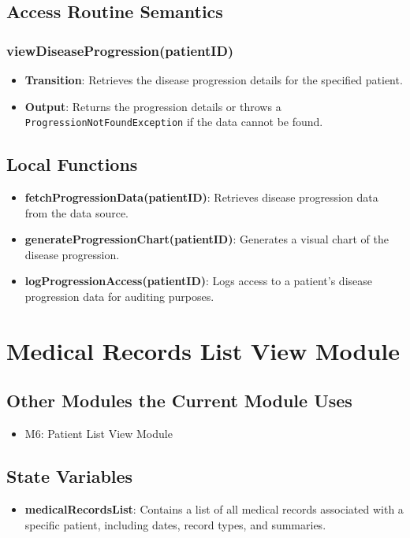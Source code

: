 \documentclass[12pt, titlepage]{article}
\begin{document}
\subsection{Access Routine Semantics}
\subsubsection{viewDiseaseProgression(patientID)}
\begin{itemize}
    \item \textbf{Transition}: Retrieves the disease progression details for the specified patient.
    \item \textbf{Output}: Returns the progression details or throws a \texttt{ProgressionNotFoundException} if the data cannot be found.
\end{itemize}

\subsection{Local Functions}
\begin{itemize}
\item \textbf{fetchProgressionData(patientID)}: Retrieves disease progression data from the data source.
\item \textbf{generateProgressionChart(patientID)}: Generates a visual chart of the disease progression.
\item \textbf{logProgressionAccess(patientID)}: Logs access to a patient's disease progression data for auditing purposes.
\end{itemize}

\section{Medical Records List View Module}

\subsection{Other Modules the Current Module Uses}
\begin{itemize}
  \item M6: Patient List View Module
\end{itemize}

\subsection{State Variables}
\begin{itemize}
\item \textbf{medicalRecordsList}: Contains a list of all medical records associated with a specific patient, including dates, record types, and summaries.
\end{itemize}
\end{document}
